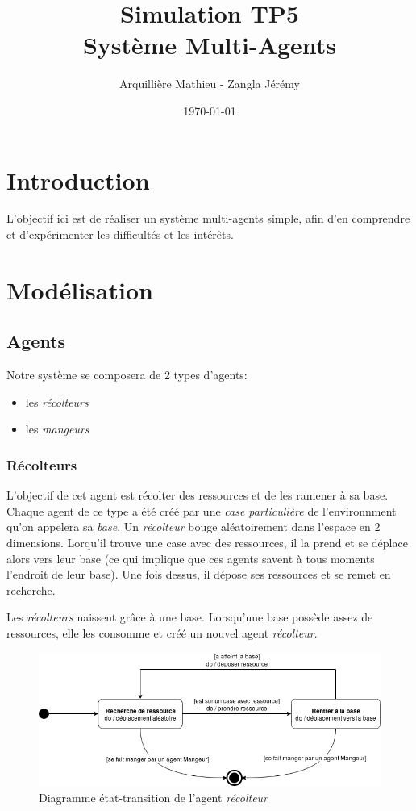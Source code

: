 \documentclass{article}
\title{Simulation TP5\\Système Multi-Agents}
\author{Arquillière Mathieu - Zangla Jérémy}
\date{\today}
\begin{document}
\begin{titlepage}
  \maketitle
\end{titlepage}

\tableofcontents
\newpage
\listoffigures
\newpage

\section{Introduction}
L'objectif ici est de réaliser un système multi-agents simple, afin d'en
comprendre et d'expérimenter les difficultés et les intérêts.

\section{Modélisation}
\subsection{Agents}
Notre système se composera de 2 types d'agents:
\begin{itemize}
  \item les \emph{récolteurs}
  \item les \emph{mangeurs}
\end{itemize}

\subsubsection{Récolteurs}
L'objectif de cet agent est récolter des ressources et de les ramener à sa base. Chaque
agent de ce type a été créé par une \emph{case particulière} de l'environnment qu'on
appelera sa \emph{base}. Un \emph{récolteur} bouge aléatoirement dans l'espace
en 2 dimensions. Lorqu'il trouve une case avec des ressources, il la prend et se déplace
alors vers leur base (ce qui implique que ces agents savent à tous moments l'endroit de
leur base). Une fois dessus, il dépose ses ressources et se remet en recherche.

Les \emph{récolteurs} naissent grâce à une base. Lorsqu'une base possède assez de ressources,
elle les consomme et créé un nouvel agent \emph{récolteur}.

\begin{figure}[!ht]
  \centering
  \caption{Diagramme état-transition de l'agent \emph{récolteur}}
  \includegraphics[scale=0.70]{img/etat-transition_recolteur.png}
\end{figure}
\end{document}
